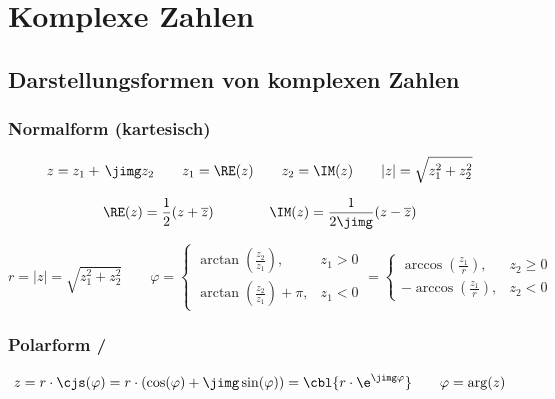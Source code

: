 \section{Komplexe Zahlen}

\subsection{Darstellungsformen von komplexen Zahlen}

\subsubsection{Normalform (kartesisch)} 

\vspace{-0.2cm}

$$ z = z_1 + \, \jimg z_2 \qquad z_1 = \RE(z) \qquad z_2 = \IM(z) \qquad \vert z \vert = \sqrt{z_1^2 + z_2^2} $$
\vspace{-2em}

$$ \RE(z) = \frac{1}{2}(z+\overline{z}) \qquad \qquad \IM(z) = \frac{1}{2\jimg}(z - \overline{z})$$


\vspace{-0.2cm}

$$ r =  \vert z \vert = \sqrt{z_1^2 + z_2^2} \qquad 
\varphi = \begin{cases} 
\arctan\left(\frac{z_2}{z_1}\right), & z_1 > 0 \\ 
\arctan\left(\frac{z_2}{z_1}\right) + \pi, & z_1 < 0 
\end{cases} = \begin{cases} 
\arccos\left(\frac{z_1}{r}\right), & z_2 \geq 0 \\ 
-\arccos\left(\frac{z_1}{r}\right), & z_2 < 0 
\end{cases}$$


\subsubsection{Polarform / }

\vspace{-0.2cm}

$$ z = r \cdot \cjs(\varphi) = r \cdot \left(\cos(\varphi) + \jimg \sin(\varphi)\right) = \cbl{r \cdot \e^{ \jimg \varphi}} \qquad \varphi = \arg(z) $$


\vspace{-0.2cm}

